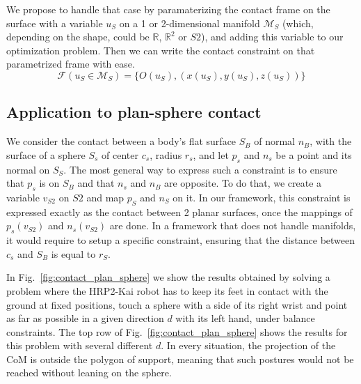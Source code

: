 We propose to handle that case by paramaterizing the contact frame on the surface with a variable $u_S$ on a 1 or 2-dimensional manifold $\mathcal{M}_S$ (which, depending on the shape, could be $\mathbb{R}$, $\mathbb{R}^2$ or $S2$), and adding this variable to our optimization problem.
Then we can write the contact constraint on that parametrized frame with ease.
\begin{equation}
\label{eq:param_frame}
  \mathcal{F}(u_S\in \mathcal{M}_S) = \{O(u_S), (x(u_S), y(u_S), z(u_S))\}
\end{equation}


\subsection{Application to plan-sphere contact}
We consider the contact between a body's flat surface $S_B$ of normal $n_B$, with the surface of a sphere $S_s$ of center $c_s$, radius $r_s$, and let $p_s$ and $n_s$ be a point and its normal on $S_S$.
The most general way to express such a constraint is to ensure that $p_s$ is on $S_B$ and that $n_s$ and $n_B$ are opposite.
To do that, we create a variable $v_{S2}$ on $S2$ and map $p_S$ and $n_S$ on it.
In our framework, this constraint is expressed exactly as the contact between 2 planar surfaces, once the mappings of $p_s(v_{S2})$ and $n_s(v_{S2})$ are done.
In a framework that does not handle manifolds, it would require to setup a specific constraint, ensuring that the distance between $c_s$ and $S_B$ is equal to $r_S$.

In Fig.~\ref{fig:contact_plan_sphere} we show the results obtained by solving a problem where the HRP2-Kai robot has to keep its feet in contact with the ground at fixed positions, touch a sphere with a side of its right wrist and point as far as possible in a given direction $d$ with its left hand, under balance constraints.
The top row of Fig.~\ref{fig:contact_plan_sphere} shows the results for this problem with several different $d$.
In every situation, the projection of the CoM is outside the polygon of support, meaning that such postures would not be reached without leaning on the sphere.

